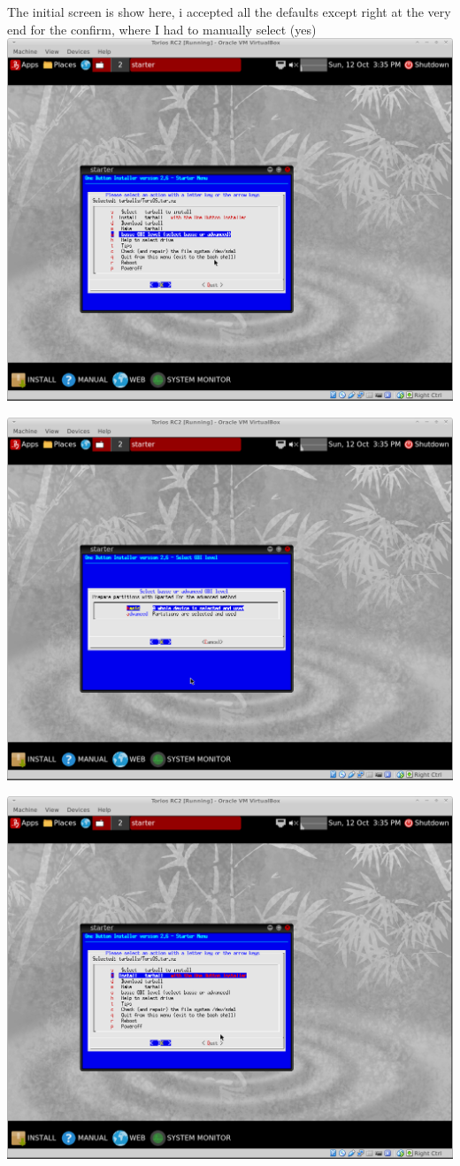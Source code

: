 \documentclass[12pt,a4paper]{book}
\begin{document}
The initial screen is show here,  i accepted all the defaults except right at the very end for the confirm, where I had to manually select (yes) \\

\includegraphics[width=0.7\linewidth]{torios-rc2-install2}

\includegraphics[width=0.7\linewidth]{torios-rc2-install3}

\includegraphics[width=0.7\linewidth]{torios-rc2-install4}
\end{document}
